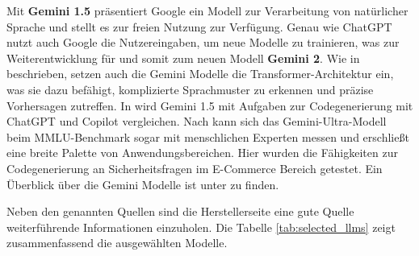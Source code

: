 
Mit \textbf{Gemini 1.5} präsentiert Google ein Modell zur Verarbeitung von natürlicher Sprache und stellt es zur freien Nutzung zur Verfügung. Genau wie ChatGPT nutzt auch Google die Nutzereingaben, um neue Modelle zu trainieren, was zur Weiterentwicklung für und somit zum neuen Modell \textbf{Gemini 2}. Wie in \cite{siam-2024} beschrieben, setzen auch die Gemini Modelle die Transformer-Architektur ein, was sie dazu befähigt, komplizierte Sprachmuster zu erkennen und präzise Vorhersagen zutreffen. In \cite{siam-2024} wird Gemini 1.5 mit Aufgaben zur Codegenerierung mit ChatGPT und Copilot vergleichen. Nach \cite{elgedawy-2024} kann sich das Gemini-Ultra-Modell beim MMLU-Benchmark sogar mit menschlichen Experten messen und erschließt eine breite Palette von Anwendungsbereichen. Hier wurden die Fähigkeiten zur Codegenerierung an Sicherheitsfragen im E-Commerce Bereich getestet. Ein Überblick über die Gemini Modelle ist unter \cite{google_gemini_model_overview} zu finden.\vspace{0.2cm}

Neben den genannten Quellen sind die Herstellerseite eine gute Quelle weiterführende Informationen einzuholen. Die Tabelle \ref{tab:selected_llms} zeigt zusammenfassend die ausgewählten Modelle.\vspace{0.2cm}

